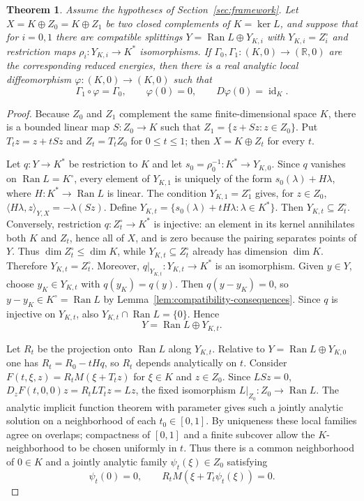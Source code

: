 \documentclass[11pt]{article}
\newtheorem{theorem}{Theorem}[section]
\theoremstyle{definition}
\theoremstyle{remark}
\begin{document}
\begin{theorem}
\label{thm:right-equivalence}
Assume the hypotheses of Section~\ref{sec:framework}. Let
$X=K\oplus Z_0=K\oplus Z_1$ be two closed complements of $K=\ker L$, and suppose that for $i=0,1$ there are compatible splittings
$Y=\operatorname{Ran}L\oplus Y_{K,i}$ with $Y_{K,i}=Z_i^\circ$ and restriction maps $\rho_i:Y_{K,i}\to K^*$ isomorphisms. If $\Gamma_0,\Gamma_1:(K,0)\to(\mathbb R,0)$ are the corresponding reduced energies, then there is a real analytic local diffeomorphism $\varphi:(K,0)\to(K,0)$ such that
$$
\Gamma_1\circ\varphi=\Gamma_0,\qquad \varphi(0)=0,\qquad D\varphi(0)=\operatorname{id}_K.
$$
\end{theorem}

\begin{proof}
Because $Z_0$ and $Z_1$ complement the same finite-dimensional space $K$, there is a bounded linear map $S:Z_0\to K$ such that $Z_1=\{z+Sz:z\in Z_0\}$. Put $T_tz=z+tSz$ and $Z_t=T_tZ_0$ for $0\le t\le1$; then $X=K\oplus Z_t$ for every $t$.

Let $q:Y\to K^*$ be restriction to $K$ and let $s_0=\rho_0^{-1}:K^*\to Y_{K,0}$. Since $q$ vanishes on $\operatorname{Ran}L=K^\circ$, every element of $Y_{K,1}$ is uniquely of the form $s_0(\lambda)+H\lambda$, where $H:K^*\to\operatorname{Ran}L$ is linear. The condition $Y_{K,1}=Z_1^\circ$ gives, for $z\in Z_0$,
$\langle H\lambda,z\rangle_{Y,X}=-\lambda(Sz)$. Define
$Y_{K,t}=\{s_0(\lambda)+tH\lambda:\lambda\in K^*\}$. Then $Y_{K,t}\subseteq Z_t^\circ$. Conversely, restriction $q:Z_t^\circ\to K^*$ is injective: an element in its kernel annihilates both $K$ and $Z_t$, hence all of $X$, and is zero because the pairing separates points of $Y$. Thus $\dim Z_t^\circ\le\dim K$, while $Y_{K,t}\subseteq Z_t^\circ$ already has dimension $\dim K$. Therefore $Y_{K,t}=Z_t^\circ$. Moreover, $q|_{Y_{K,t}}:Y_{K,t}\to K^*$ is an isomorphism. Given $y\in Y$, choose $y_K\in Y_{K,t}$ with $q(y_K)=q(y)$. Then $q(y-y_K)=0$, so $y-y_K\in K^\circ=\operatorname{Ran}L$ by Lemma~\ref{lem:compatibility-consequences}. Since $q$ is injective on $Y_{K,t}$, also $Y_{K,t}\cap\operatorname{Ran}L=\{0\}$. Hence
$$
Y=\operatorname{Ran}L\oplus Y_{K,t}.
$$

Let $R_t$ be the projection onto $\operatorname{Ran}L$ along $Y_{K,t}$. Relative to $Y=\operatorname{Ran}L\oplus Y_{K,0}$ one has $R_t=R_0-tHq$, so $R_t$ depends analytically on $t$. Consider
$F(t,\xi,z)=R_tM(\xi+T_tz)$ for $\xi\in K$ and $z\in Z_0$. Since $LSz=0$,
$D_zF(t,0,0)z=R_tLT_tz=Lz$, the fixed isomorphism $L|_{Z_0}:Z_0\to\operatorname{Ran}L$. The analytic implicit function theorem with parameter gives such a jointly analytic solution on a neighborhood of each $t_0\in[0,1]$. By uniqueness these local families agree on overlaps; compactness of $[0,1]$ and a finite subcover allow the $K$-neighborhood to be chosen uniformly in $t$. Thus there is a common neighborhood of $0\in K$ and a jointly analytic family $\psi_t(\xi)\in Z_0$ satisfying
$$
\psi_t(0)=0,
\qquad
R_tM(\xi+T_t\psi_t(\xi))=0.
$$


\end{proof}
\end{document}
